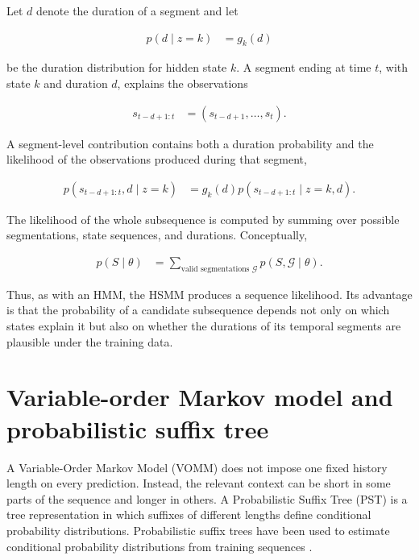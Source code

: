 \documentclass[a4paper]{article}
\begin{document}
        Let \(d\) denote the duration of a segment and let

        \begin{align}
            p(d\mid z=k)
            &=
            g_k(d)
        \end{align}

        \noindent
        be the duration distribution for hidden state \(k\). A segment ending at time \(t\), with state \(k\) and duration \(d\), explains the observations

        \begin{align}
            s_{t-d+1:t}
            &=
            (s_{t-d+1},\dots,s_t).
        \end{align}

        \noindent
        A segment-level contribution contains both a duration probability and the likelihood of the observations produced during that segment,

        \begin{align}
            p(s_{t-d+1:t},d\mid z=k)
            &=
            g_k(d)
            p(s_{t-d+1:t}\mid z=k,d).
        \end{align}

        \noindent
        The likelihood of the whole subsequence is computed by summing over possible segmentations, state sequences, and durations. Conceptually,

        \begin{align}
            p(S\mid\theta)
            &=
            \sum_{\text{valid segmentations }\mathcal{G}}
            p(S,\mathcal{G}\mid\theta).
        \end{align}

        \noindent
        Thus, as with an HMM, the HSMM produces a sequence likelihood. Its advantage is that the probability of a candidate subsequence depends not only on which states explain it but also on whether the durations of its temporal segments are plausible under the training data.

    \section{Variable-order Markov model and probabilistic suffix tree}

        A Variable-Order Markov Model (VOMM) does not impose one fixed history length on every prediction. Instead, the relevant context can be short in some parts of the sequence and longer in others. A Probabilistic Suffix Tree (PST) is a tree representation in which suffixes of different lengths define conditional probability distributions. Probabilistic suffix trees have been used to estimate conditional probability distributions from training sequences \cite{pimentel-clifton-clifton-tarassenko-2014-a-review-of-novelty-detection}.
\end{document}

